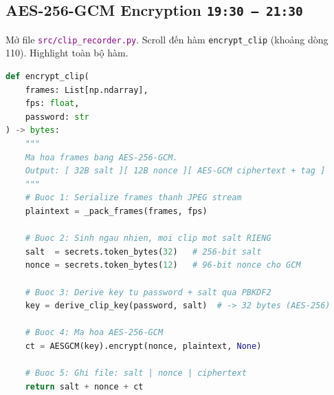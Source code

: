 \documentclass[12pt, a4paper]{article}
\newcommand{\timing}[1]{%
  \hfill\colorbox{NavyBlue!20}{\texttt{\small #1}}%
}
\newcommand{\fpath}[1]{\texttt{\textcolor{purple}{#1}}}
\begin{document}
\subsection{AES-256-GCM Encryption \timing{19:30 – 21:30}}

\begin{action}
Mở file \fpath{src/clip\_recorder.py}. Scroll đến hàm \texttt{encrypt\_clip}
(khoảng dòng 110). Highlight toàn bộ hàm.
\end{action}

\begin{lstlisting}[language=Python, caption={src/clip\_recorder.py --- encrypt\_clip}]
def encrypt_clip(
    frames: List[np.ndarray],
    fps: float,
    password: str
) -> bytes:
    """
    Ma hoa frames bang AES-256-GCM.
    Output: [ 32B salt ][ 12B nonce ][ AES-GCM ciphertext + tag ]
    """
    # Buoc 1: Serialize frames thanh JPEG stream
    plaintext = _pack_frames(frames, fps)

    # Buoc 2: Sinh ngau nhien, moi clip mot salt RIENG
    salt  = secrets.token_bytes(32)   # 256-bit salt
    nonce = secrets.token_bytes(12)   # 96-bit nonce cho GCM

    # Buoc 3: Derive key tu password + salt qua PBKDF2
    key = derive_clip_key(password, salt)  # -> 32 bytes (AES-256)

    # Buoc 4: Ma hoa AES-256-GCM
    ct = AESGCM(key).encrypt(nonce, plaintext, None)

    # Buoc 5: Ghi file: salt | nonce | ciphertext
    return salt + nonce + ct
\end{lstlisting}
\end{document}
